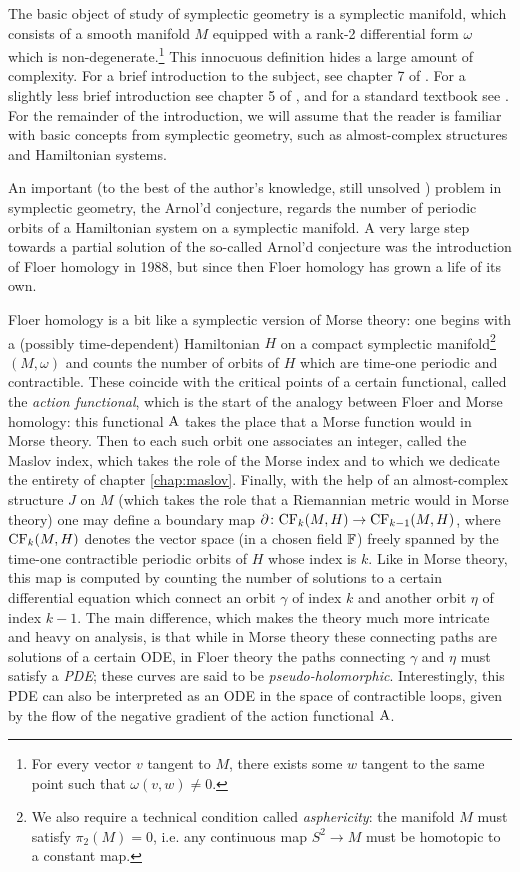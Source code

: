 The basic object of study of symplectic geometry is a symplectic manifold, which consists of a smooth manifold $M$ equipped with a rank-2 differential form $\omega$ which is non-degenerate.\footnote{For every vector $v$ tangent to $M$, there exists some $w$ tangent to the same point such that $\omega(v,w) \neq 0$.} This innocuous definition hides a large amount of complexity. For a brief introduction to the subject, see chapter 7 of \cite{polterovich}. For a slightly less brief introduction see chapter 5 of \cite{audin}, and for a standard textbook see \cite{mcduff}. For the remainder of the introduction, we will assume that the reader is familiar with basic concepts from symplectic geometry, such as almost-complex structures and Hamiltonian systems.

An important (to the best of the author's knowledge, still unsolved \cite{puto}) problem in symplectic geometry, the Arnol'd conjecture, regards the number of periodic orbits of a Hamiltonian system on a symplectic manifold. A very large step towards a partial solution of the so-called Arnol'd conjecture was the introduction of Floer homology in 1988, but since then Floer homology has grown a life of its own.

Floer homology is a bit like a symplectic version of Morse theory: one begins with a (possibly time-dependent) Hamiltonian $H$ on a compact symplectic manifold\footnote{We also require a technical condition called \emph{asphericity}: the manifold $M$ must satisfy $\pi_2(M) = 0$, i.e. any continuous map $S^2 \to M$ must be homotopic to a constant map.} $(M,\omega)$ and counts the number of orbits of $H$ which are time-one periodic and contractible. These coincide with the critical points of a certain functional, called the \emph{action functional}, which is the start of the analogy between Floer and Morse homology: this functional $\AA$ takes the place that a Morse function would in Morse theory. Then to each such orbit one associates an integer, called the Maslov index, which takes the role of the Morse index and to which we dedicate the entirety of chapter \ref{chap:maslov}. Finally, with the help of an almost-complex structure $J$ on $M$ (which takes the role that a Riemannian metric would in Morse theory) one may define a boundary map $\partial \colon \CF_k(M,H) \to \CF_{k-1}(M,H)$, where $\CF_k(M,H)$ denotes the vector space (in a chosen field $\FF$) freely spanned by the time-one contractible periodic orbits of $H$ whose index is $k$. Like in Morse theory, this map is computed by counting the number of solutions to a certain differential equation which connect an orbit $\gamma$ of index $k$ and another orbit $\eta$ of index $k-1$. The main difference, which makes the theory much more intricate and heavy on analysis, is that while in Morse theory these connecting paths are solutions of a certain ODE, in Floer theory the paths connecting $\gamma$ and $\eta$ must satisfy a \emph{PDE}; these curves are said to be \emph{pseudo-holomorphic}. Interestingly, this PDE can also be interpreted as an ODE in the space of contractible loops, given by the flow of the negative gradient of the action functional $\AA$.

